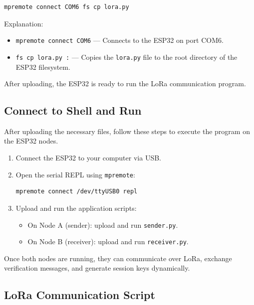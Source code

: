 \begin{verbatim}
mpremote connect COM6 fs cp lora.py 
\end{verbatim}

\noindent Explanation:
\begin{itemize}
    \item \texttt{mpremote connect COM6} — Connects to the ESP32 on port COM6.
    \item \texttt{fs cp lora.py :} — Copies the \texttt{lora.py} file to the root directory of the ESP32 filesystem.
\end{itemize}

After uploading, the ESP32 is ready to run the LoRa communication program.

\subsection{Connect to Shell and Run}

After uploading the necessary files, follow these steps to execute the program on the ESP32 nodes.

\begin{enumerate}
    \item Connect the ESP32 to your computer via USB.
    
    \item Open the serial REPL using \texttt{mpremote}:

\begin{verbatim}
mpremote connect /dev/ttyUSB0 repl
\end{verbatim}
    
    \item Upload and run the application scripts:
    \begin{itemize}
        \item On Node A (sender): upload and run \texttt{sender.py}.
        \item On Node B (receiver): upload and run \texttt{receiver.py}.
    \end{itemize}
\end{enumerate}

Once both nodes are running, they can communicate over LoRa, exchange verification messages, and generate session keys dynamically.

\subsection{LoRa Communication Script}

